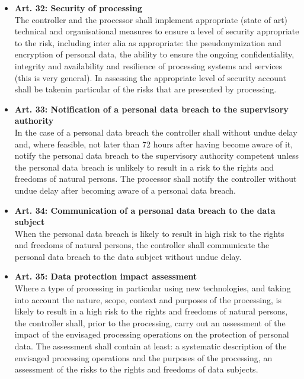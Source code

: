 \begin{itemize}
    \item \textbf{Art. 32: Security of processing}
    \\ The controller and the processor shall implement appropriate (state of art) technical and organisational measures to ensure a level of security appropriate to the risk, including inter alia as appropriate: the pseudonymization and encryption of personal data, the ability to ensure the ongoing confidentiality, integrity and availability and resilience of processing systems and services (this is very general). In assessing the appropriate level of security account shall be takenin particular of the risks that are presented by processing.
    \item \textbf{Art. 33: Notification of a personal data breach to the supervisory authority}
    \\ In the case of a personal data breach the controller shall without undue delay and, where feasible, not later than 72 hours after having become aware of it, notify the personal data breach to the supervisory authority competent unless the personal data breach is unlikely to result in a risk to the rights and freedoms of natural persons. The processor shall notify the controller without undue delay after becoming aware of a personal data breach.
    \item \textbf{Art. 34: Communication of a personal data breach to the data subject}
    \\ When the personal data breach is likely to result in high risk to the rights and freedoms of natural persons, the controller shall communicate the personal data breach to the data subject without undue delay.
    \item \textbf{Art. 35: Data protection impact assessment}
    \\ Where a type of processing in particular using new technologies, and taking into account the nature, scope, context and purposes of the processing, is likely to result in a high risk to the rights and freedoms of natural persons, the controller shall, prior to the processing, carry out an assessment of the impact of the envisaged processing operations on the protection of personal data.
    The assessment shall contain at least: a systematic description of the envisaged processing operations and the purposes of the processing, an assessment of the risks to the rights and freedoms of data subjects. 
\end{itemize}
